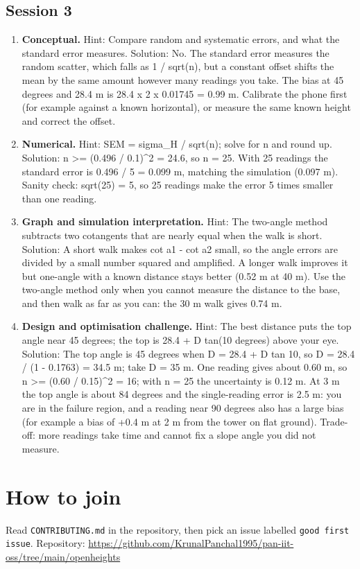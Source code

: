 \documentclass[11pt,a4paper]{article}
\begin{document}
\subsection*{Session 3}
\begin{enumerate}[nosep]
\item \textbf{Conceptual.} Hint: Compare random and systematic errors, and what the standard error measures. Solution: No. The standard error measures the random scatter, which falls as 1 / sqrt(n), but a constant offset shifts the mean by the same amount however many readings you take. The bias at 45 degrees and 28.4 m is 28.4 x 2 x 0.01745 = 0.99 m. Calibrate the phone first (for example against a known horizontal), or measure the same known height and correct the offset.
\item \textbf{Numerical.} Hint: SEM = sigma\_H / sqrt(n); solve for n and round up. Solution: n \textgreater{}= (0.496 / 0.1)\textasciicircum{}2 = 24.6, so n = 25. With 25 readings the standard error is 0.496 / 5 = 0.099 m, matching the simulation (0.097 m). Sanity check: sqrt(25) = 5, so 25 readings make the error 5 times smaller than one reading.
\item \textbf{Graph and simulation interpretation.} Hint: The two-angle method subtracts two cotangents that are nearly equal when the walk is short. Solution: A short walk makes cot a1 - cot a2 small, so the angle errors are divided by a small number squared and amplified. A longer walk improves it but one-angle with a known distance stays better (0.52 m at 40 m). Use the two-angle method only when you cannot measure the distance to the base, and then walk as far as you can: the 30 m walk gives 0.74 m.
\item \textbf{Design and optimisation challenge.} Hint: The best distance puts the top angle near 45 degrees; the top is 28.4 + D tan(10 degrees) above your eye. Solution: The top angle is 45 degrees when D = 28.4 + D tan 10, so D = 28.4 / (1 - 0.1763) = 34.5 m; take D = 35 m. One reading gives about 0.60 m, so n \textgreater{}= (0.60 / 0.15)\textasciicircum{}2 = 16; with n = 25 the uncertainty is 0.12 m. At 3 m the top angle is about 84 degrees and the single-reading error is 2.5 m: you are in the failure region, and a reading near 90 degrees also has a large bias (for example a bias of +0.4 m at 2 m from the tower on flat ground). Trade-off: more readings take time and cannot fix a slope angle you did not measure.
\end{enumerate}

\section{How to join}
Read \texttt{CONTRIBUTING.md} in the repository, then pick an issue labelled \texttt{good first issue}. Repository: \url{https://github.com/KrunalPanchal1995/pan-iit-oss/tree/main/openheights}
\end{document}

